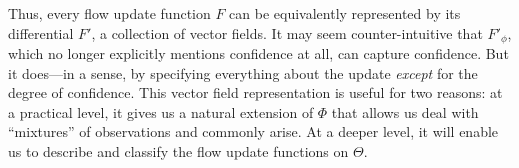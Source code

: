 Thus, every 
flow update function $F$
 can be equivalently represented
by its differential $F'$, a collection of vector fields.
%
%
It may seem counter-intuitive that $F'_\phi$,
which no longer explicitly mentions confidence at all,
can capture confidence.
But it does---in a sense, by specifying
everything about the update \emph{except} for the degree of confidence.
This vector field representation is useful for two reasons:
at a practical level, it gives us a natural extension of $\Phi$
that allows us deal with ``mixtures'' of observations and commonly arise.
At a deeper level, it will enable us to describe and classify
the flow update functions on $\Theta$.

